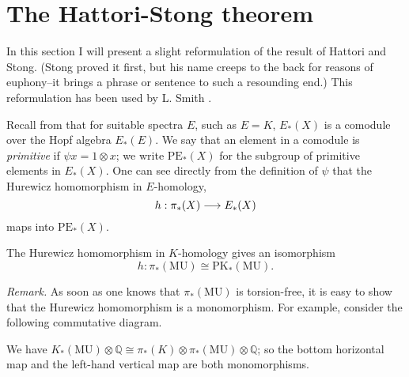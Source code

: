 \documentclass[../main]{subfiles}
\begin{document}
\label{sec:p2c14}

\chapter{The Hattori-Stong theorem}

In this section I will present a slight reformulation of the result
of Hattori and Stong. (Stong proved it first, but his name creeps to the
back for reasons of euphony--it brings a phrase or sentence to such a
resounding end.) This reformulation has been used by L. Smith \cite{smith}. 

Recall from \cite[Lecture 3]{adams3} that for suitable spectra $E$, such as $E=K$, $E_\ast(X)$ is a comodule over the Hopf algebra $E_\ast(E)$. We say that an element in a comodule is \emph{primitive} if $\psi x = 1\otimes x$; we write $\mathrm{PE}_\ast(X)$ for the subgroup of primitive elements in $E_\ast(X)$. One can see directly from the definition of $\psi$ that the Hurewicz homomorphism in $E$-homology, \[h:\pi_\ast(X)\longrightarrow E_\ast(X)\] maps into $\mathrm{PE}_\ast(X)$. 
\begin{theorem}
\label{thm:p2c14.1}
The Hurewicz homomorphism in $K$-homology gives an isomorphism \[h:\pi_\ast(\mathrm{MU})\cong\mathrm{PK}_\ast(\mathrm{MU}).\]
\end{theorem}
\emph{Remark.} As soon as one knows that $\pi_\ast(\mathrm{MU})$ is torsion-free, it is easy to show that the Hurewicz homomorphism is a monomorphism. For example, consider the following commutative diagram.
\begin{center}
\end{center}
We have $K_\ast(\mathrm{MU})\otimes\mathbb{Q}\cong\pi_\ast(K)\otimes\pi_\ast(\mathrm{MU})\otimes\mathbb{Q}$; so the bottom horizontal map and the left-hand vertical map are both monomorphisms.
\end{document}
